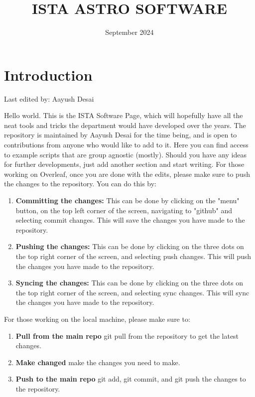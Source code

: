 \documentclass{article}
\title{ISTA ASTRO SOFTWARE}
\date{September 2024}
\newcommand{\setlasteditor}[1]{\gdef\lasteditor{#1}}
\newcommand{\lastedited}{%
    \vspace{1mm} {\footnotesize Last edited by: \lasteditor} \vspace{3mm}
    \newline

}
\begin{document}
\maketitle


\tableofcontents
\newpage
\section*{Introduction}
\setlasteditor{Aayush Desai}
\lastedited
\noindent
Hello world. This is the ISTA Software Page, which will hopefully have all the neat tools and tricks the department would have developed over the years. The repository is maintained by Aayush Desai for the time being, and is open to contributions from anyone who would like to add to it.
\newline
\noindent
Here you can find access to example scripts that are group agnostic (mostly). Should you have any ideas for further developments, just add another section and start writing.
\newline
\newline
For those working on Overleaf, once you are done with the edits, please make sure to push the changes to the repository. You can do this by:

\begin{enumerate}
    \item \textbf{Committing the changes:} This can be done by clicking on the "menu" button, on the top left corner of the screen, navigating to "github" and selecting commit changes. This will save the changes you have made to the repository.
    \item \textbf{Pushing the changes:} This can be done by clicking on the three dots on the top right corner of the screen, and selecting push changes. This will push the changes you have made to the repository.
    \item \textbf{Syncing the changes:} This can be done by clicking on the three dots on the top right corner of the screen, and selecting sync changes. This will sync the changes you have made to the repository.
\end{enumerate}
\noindent
For those working on the local machine, please make sure to:

\begin{enumerate}
    \item \textbf{Pull from the main repo} git pull from the repository to get the latest changes.
    \item \textbf{Make changed} make the changes you need to make.
    \item \textbf{Push to the main repo} git add, git commit, and git push the changes to the repository.
\end{enumerate}
\end{document}

